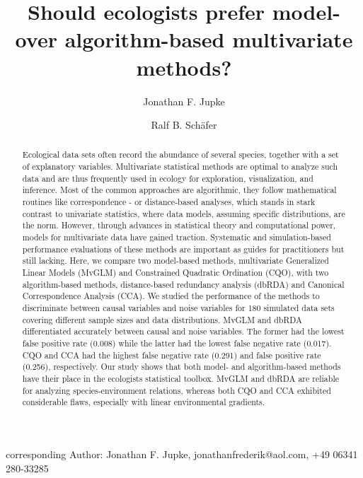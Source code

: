 \documentclass[a4paper,11pt]{article}
\title{Should ecologists prefer model- over algorithm-based multivariate methods?}
\author[1]{Jonathan F. Jupke}
\author[1]{Ralf B. Schäfer}
\affil[1]{iES Landau, Institute for Environmental Sciences, University Koblenz-Landau, Fortstraße 7, 76829 Landau, Germany}%
\date{}
\begin{document}

    \maketitle
    corresponding Author: Jonathan F. Jupke, jonathanfrederik@aol.com,
    +49 06341 280-33285\\


    \newpage

        \begin{abstract}%
            Ecological data sets often record the abundance of several species, together with a set of explanatory variables. 
            Multivariate statistical methods are optimal to analyze such data and are thus frequently used in ecology for exploration, visualization, and inference. 
            Most of the common approaches are algorithmic, they follow mathematical routines like correspondence - or distance-based analyses, which stands in stark contrast to univariate statistics, where data models, assuming specific distributions, are the norm.
            However, through advances in statistical theory and computational power, models for multivariate data have gained traction. 
            Systematic and simulation-based performance evaluations of these methods are important as guides for practitioners but still lacking.
            Here, we compare two model-based methods, multivariate Generalized Linear Models (MvGLM) and Constrained Quadratic Ordination (CQO), with two algorithm-based methods, distance-based redundancy analysis (dbRDA) and Canonical Correspondence Analysis (CCA).
            We studied the performance of the methods to discriminate between causal variables and noise variables for 180 simulated data sets covering different sample sizes and data distributions.
            MvGLM and dbRDA differentiated accurately between causal and noise variables.
            The former had the lowest false positive rate (0.008) while the latter had the lowest false negative rate (0.017).
            CQO and CCA had the highest false negative rate (0.291) and false positive rate (0.256), respectively. 
           Our study shows that both model- and algorithm-based methods have their place in the ecologists statistical toolbox. 
        MvGLM and dbRDA are reliable for analyzing species-environment relations, whereas both CQO and CCA exhibited considerable flaws, especially with linear environmental gradients. 
           
        \end{abstract}
\end{document}

